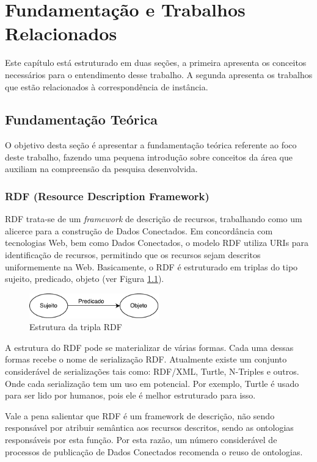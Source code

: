 \chapter{Fundamentação e Trabalhos Relacionados}
\label{cap:fundamentacao}
Este capítulo está estruturado em duas seções, a primeira apresenta os conceitos necessários para o entendimento desse trabalho. A segunda apresenta os trabalhos que estão relacionados à correspondência de instância.

\section{Fundamentação Teórica}
O objetivo desta seção é apresentar a fundamentação teórica referente ao foco deste trabalho, fazendo uma pequena introdução  sobre conceitos da área que auxiliam na compreensão da pesquisa desenvolvida.

\subsection{RDF (Resource Description Framework)}

RDF trata-se de um \textit{framework} de descrição de recursos, trabalhando como um alicerce para a construção de Dados Conectados. Em concordância com tecnologias Web, bem como Dados Conectados, o modelo RDF utiliza URIs para identificação de recursos, permitindo que os recursos sejam descritos uniformemente na Web. Basicamente, o RDF é estruturado em triplas do tipo sujeito, predicado, objeto (ver Figura \ref{fig:spo}). 

\begin{figure}[!ht]
	\centering
	\includegraphics[width=0.5\textwidth]{./imagens/Sujeito-predicado-objeto.pdf}
    \caption{Estrutura da tripla RDF}
	\label{fig:spo}
\end{figure}

A estrutura do RDF pode se materializar de várias formas. Cada uma dessas formas recebe o nome de serialização RDF. Atualmente existe um conjunto considerável de serializações tais como: RDF/XML, Turtle, N-Triples e outros. Onde cada serialização tem um uso em potencial. Por exemplo, Turtle é usado para ser lido por humanos, pois ele é melhor estruturado para isso. 

Vale a pena salientar que RDF é um framework de descrição, não sendo responsável por atribuir semântica aos recursos descritos, sendo as ontologias responsáveis por esta função. Por esta razão, um número considerável de processos de publicação de Dados Conectados \cite{bizer2007publish, hyland2011joy, villazon2011methodological, Avila2015} recomenda o reuso de ontologias. 

